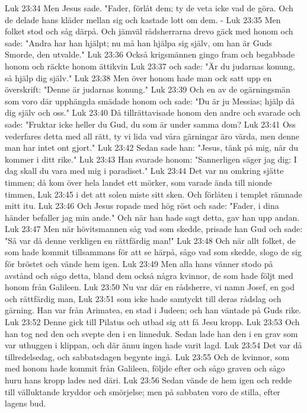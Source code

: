 Luk 23:34  Men Jesus sade. "Fader, förlåt dem; ty de veta icke vad de göra. Och de delade hans kläder mellan sig och kastade lott om dem. -
Luk 23:35  Men folket stod och såg därpå. Och jämväl rådsherrarna drevo gäck med honom och sade: "Andra har han hjälpt; nu må han hjälpa sig själv, om han är Guds Smorde, den utvalde."
Luk 23:36  Också krigsmännen gingo fram och begabbade honom och räckte honom ättikvin
Luk 23:37  och sade: "Är du judarnas konung, så hjälp dig själv."
Luk 23:38  Men över honom hade man ock satt upp en överskrift: "Denne är judarnas konung."
Luk 23:39  Och en av de ogärningsmän som voro där upphängda smädade honom och sade: "Du är ju Messias; hjälp då dig själv och oss."
Luk 23:40  Då tillrättavisade honom den andre och svarade och sade: "Fruktar icke heller du Gud, du som är under samma dom?
Luk 23:41  Oss vederfares detta med all rätt, ty vi lida vad våra gärningar äro värda, men denne man har intet ont gjort."
Luk 23:42  Sedan sade han: "Jesus, tänk på mig, när du kommer i ditt rike."
Luk 23:43  Han svarade honom: "Sannerligen säger jag dig: I dag skall du vara med mig i paradiset."
Luk 23:44  Det var nu omkring sjätte timmen; då kom över hela landet ett mörker, som varade ända till nionde timmen,
Luk 23:45  i det att solen miste sitt sken. Och förlåten i templet rämnade mitt itu.
Luk 23:46  Och Jesus ropade med hög röst och sade: "Fader, i dina händer befaller jag min ande." Och när han hade sagt detta, gav han upp andan.
Luk 23:47  Men när hövitsmannen såg vad som skedde, prisade han Gud och sade: "Så var då denne verkligen en rättfärdig man!"
Luk 23:48  Och när allt folket, de som hade kommit tillsammans för att se härpå, sågo vad som skedde, slogo de sig för bröstet och vände hem igen.
Luk 23:49  Men alla hans vänner stodo på avstånd och sågo detta, bland dem också några kvinnor, de som hade följt med honom från Galileen.
Luk 23:50  Nu var där en rådsherre, vi namn Josef, en god och rättfärdig man,
Luk 23:51  som icke hade samtyckt till deras rådslag och gärning. Han var från Arimatea, en stad i Judeen; och han väntade på Guds rike.
Luk 23:52  Denne gick till Pilatus och utbad sig att få Jesu kropp.
Luk 23:53  Och han tog ned den och svepte den i en linneduk. Sedan lade han den i en grav som var uthuggen i klippan, och där ännu ingen hade varit lagd.
Luk 23:54  Det var då tillredelsedag, och sabbatsdagen begynte ingå.
Luk 23:55  Och de kvinnor, som med honom hade kommit från Galileen, följde efter och sågo graven och sågo huru hans kropp lades ned däri.
Luk 23:56  Sedan vände de hem igen och redde till välluktande kryddor och smörjelse; men på sabbaten voro de stilla, efter lagens bud.
